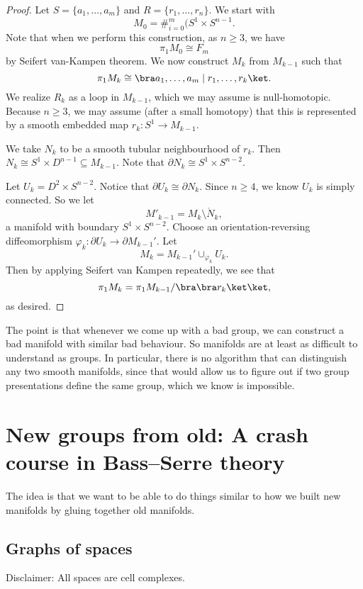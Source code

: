 \documentclass[a4paper]{article}
\begin{document}
\begin{proof}
  Let $S = \{a_1, \ldots, a_m\}$ and $R = \{r_1, \ldots, r_n\}$. We start with
  \[
    M_0 = \#_{i = 0}^m (S^1 \times S^{n - 1}.
  \]
  Note that when we perform this construction, as $n \geq 3$, we have
  \[
    \pi_1M_0 \cong F_m
  \]
  by Seifert van-Kampen theorem. We now construct $M_k$ from $M_{k - 1}$ such that
  \[
    \pi_1 M_k \cong \bra a_1, \ldots, a_m \mid r_1, \ldots, r_k\ket.
  \]
  We realize $R_k$ as a loop in $M_{k - 1}$, which we may assume is null-homotopic. Because $n \geq 3$, we may assume (after a small homotopy) that this is represented by a smooth embedded map $r_k: S^1 \to M_{k - 1}$.

  We take $N_k$ to be a smooth tubular neighbourhood of $r_k$. Then $N_k \cong S^1 \times D^{n - 1} \subseteq M_{k - 1}$. Note that $\partial N_k \cong S^1 \times S^{n - 2}$.

  Let $U_k = D^2 \times S^{n - 2}$. Notice that $\partial U_k \cong \partial N_k$. Since $n \geq 4$, we know $U_k$ is simply connected. So we let
  \[
    M'_{k - 1} = M_k \setminus \mathring{N}_k,
  \]
  a manifold with boundary $S^1 \times S^{n - 2}$. Choose an orientation-reversing diffeomorphism $\varphi_k: \partial U_k \to \partial M_{k - 1}'$. Let
  \[
    M_k = M_{k - 1}' \cup_{\varphi_k} U_k.
  \]
  Then by applying Seifert van Kampen repeatedly, we see that
  \[
    \pi_1 M_k = \pi_1 M_{k - 1} / \bra \bra r_k \ket \ket,
  \]
  as desired.
\end{proof}

The point is that whenever we come up with a bad group, we can construct a bad manifold with similar bad behaviour. So manifolds are at least as difficult to understand as groups. In particular, there is no algorithm that can distinguish any two smooth manifolds, since that would allow us to figure out if two group presentations define the same group, which we know is impossible.

\section{New groups from old: A crash course in Bass--Serre theory}
The idea is that we want to be able to do things similar to how we built new manifolds by gluing together old manifolds.

\subsection{Graphs of spaces}
Disclaimer: All spaces are cell complexes.
\end{document}
